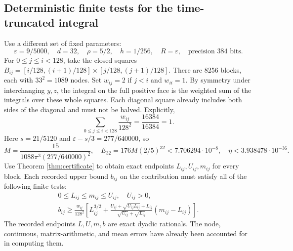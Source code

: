 \documentclass[11pt,a4paper]{article}
\theoremstyle{definition}\newtheorem{definition}[theorem]{Definition}
\theoremstyle{remark}\newtheorem{remark}[theorem]{Remark}
\begin{document}
\subsection{Deterministic finite tests for the time-truncated integral}
Use a different set of fixed parameters:
\begin{equation}\label{eq:Iparams}
 \varepsilon=9/5000,\quad d=32,\quad\rho=5/2,\quad
 h=1/256,\quad R=\varepsilon,\quad\text{precision }384\text{ bits}.
\end{equation}
For $0\le j\le i<128$, take the closed squares
$B_{ij}=[i/128,(i+1)/128]\times[j/128,(j+1)/128]$.
There are 8256 blocks, each with $33^2=1089$ nodes. Set $w_{ij}=2$ if $j<i$ and $w_{ii}=1$. By symmetry under interchanging $y,z$, the integral on the full positive face is the weighted sum of the integrals over these whole squares. Each diagonal square already includes both sides of the diagonal and must not be halved. Explicitly,
\begin{equation}\label{eq:area}
 \sum_{0\le j\le i<128}\frac{w_{ij}}{128^2}
 =\frac{16384}{16384}=1.
\end{equation}
Here $s=21/5120$ and $\varepsilon-s/3=277/640000$, so
\begin{equation}\label{eq:Ierrors}
 M=\frac{15}{1088\pi^3(277/640000)^2},\quad
 E_{32}=176M(2/5)^{32}<7.706294\cdot10^{-8},\quad
 \eta<3.938478\cdot10^{-36}.
\end{equation}
Use Theorem \ref{thm:certificate} to obtain exact endpoints $L_{ij},U_{ij},m_{ij}$ for every block. Each recorded upper bound $b_{ij}$ on the contribution must satisfy all of the following finite tests:
\begin{equation}\label{eq:finite-I}
 \begin{gathered}
 0\le L_{ij}\le m_{ij}\le U_{ij},\quad U_{ij}>0,\\
 b_{ij}\ge\frac{w_{ij}}{128^2}\left[
 L_{ij}^{3/2}+\frac{U_{ij}+\sqrt{U_{ij}L_{ij}}+L_{ij}}
 {\sqrt{U_{ij}}+\sqrt{L_{ij}}}(m_{ij}-L_{ij})\right].
 \end{gathered}
\end{equation}
The recorded endpoints $L,U,m,b$ are exact dyadic rationals. The node, continuous, matrix-arithmetic, and mean errors have already been accounted for in computing them.
\end{document}
